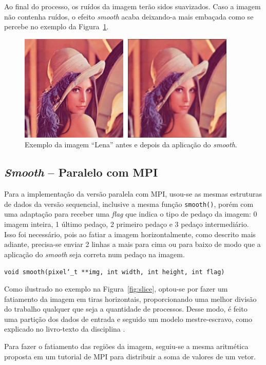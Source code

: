 Ao final do processo, os ruídos da imagem terão sidos suavizados. Caso a imagem não contenha ruídos, o efeito \textit{smooth} acaba deixando-a mais embaçada como se percebe no exemplo da Figura~\ref{fig:lena-smooth}.

\begin{figure}[h]
	\centering
	\includegraphics{./input/lena-smooth.png}
	\caption{Exemplo da imagem ``Lena'' \cite{bib:lena} antes e depois da aplicação do \textit{smooth}. \label{fig:lena-smooth}}
\end{figure}

\subsection{\textit{Smooth} -- Paralelo com MPI}

Para a implementação da versão paralela com MPI, usou-se as mesmas estruturas de dados da versão sequencial, inclusive a mesma função \texttt{smooth()}, porém com uma adaptação para receber uma \textit{flag} que indica o tipo de pedaço da imagem: 0 imagem inteira, 1 último pedaço, 2 primeiro pedaço e 3 pedaço intermediário. Isso foi necessário, pois ao fatiar a imagem horizontalmente, como descrito mais adiante, precisa-se enviar 2 linhas a mais para cima ou para baixo de modo que a aplicação do \textit{smooth} seja correta num pedaço na imagem.

\texttt{void smooth(pixel\char`_t **img, int width, int height, int flag)}

Como ilustrado no exemplo na Figura~\ref{fig:slice}, optou-se por fazer um fatiamento da imagem em tiras horizontais, proporcionando uma melhor divisão do trabalho qualquer que seja a quantidade de processos. Desse modo, é feito uma partição dos dados de entrada e seguido um modelo mestre-escravo, como explicado no livro-texto da disciplina \cite{bib:livro-divisao}.

Para fazer o fatiamento das regiões da imagem, seguiu-se a mesma aritmética proposta em um tutorial \cite{bib:intro} de MPI para distribuir a soma de valores de um vetor.

